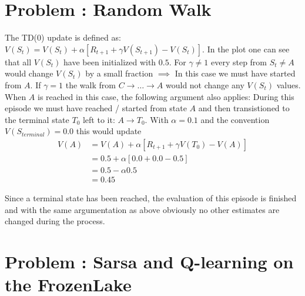 \documentclass[12pt]{scrartcl}
\newcounter{exnum}
\newcommand{\exercise}[1]{\section*{Problem \theexnum\stepcounter{exnum}: #1}}
\begin{document}
\setcounter{exnum}{1}
\exercise{Random Walk}

The TD(0) update is defined as: $V(S_t) = V(S_t) + \alpha [R_{t + 1} + \gamma V(S_{t + 1}) - V(S_t)]$.
In the plot one can see that all $V(S_t)$ have been initialized with $0.5$.
For $\gamma \neq 1$ every step from $S_t \neq A$  would change $V(S_t)$ by a small fraction $\implies$ In this case we must have started from $A$.
If $\gamma = 1$ the walk from $C \to \ldots \to A$ would not change any $V(S_t)$ values. When $A$ is reached in this case, the following argument also applies:
During this episode we must have reached / started from state $A$ and then transistioned to the terminal state $T_0$ left to it: $A \to T_0$.
With $\alpha = 0.1$ and the convention $V(S_{terminal}) = 0.0$ this would update
\begin{align*}
  V(A) &= V(A) + \alpha [R_{t + 1} + \gamma V(T_0) - V(A)] \\
       &= 0.5 + \alpha [0.0 + 0.0 - 0.5] \\
       &= 0.5 - \alpha 0.5 \\
       &= 0.45
\end{align*}

Since a terminal state has been reached, the evaluation of this episode is finished and with the same argumentation as above
obviously no other estimates are changed during the process.

\exercise{Sarsa and Q-learning on the FrozenLake}
\end{document}
